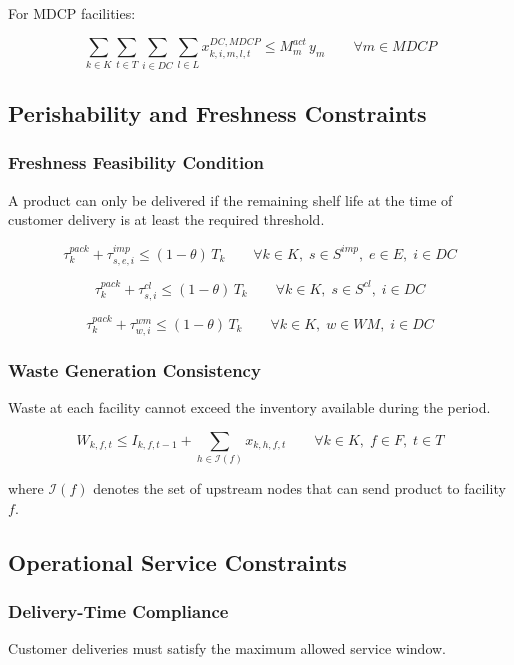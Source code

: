 \documentclass[12pt]{article}
\begin{document}
For MDCP facilities:

\[
\sum_{k \in K}\sum_{t \in T}\sum_{i \in DC}\sum_{l \in L}
x^{DC,MDCP}_{k,i,m,l,t}
\leq
M^{act}_m\, y_m
\qquad
\forall m \in MDCP
\]

\subsection{Perishability and Freshness Constraints}

\subsubsection{Freshness Feasibility Condition}

A product can only be delivered if the remaining shelf life at the time of customer delivery is at least the required threshold.

\[
\tau^{pack}_k + \tau^{imp}_{s,e,i} \leq (1-\theta)\, T_k
\qquad
\forall k \in K,\; s \in S^{imp},\; e \in E,\; i \in DC
\]

\[
\tau^{pack}_k + \tau^{cl}_{s,i} \leq (1-\theta)\, T_k
\qquad
\forall k \in K,\; s \in S^{cl},\; i \in DC
\]

\[
\tau^{pack}_k + \tau^{wm}_{w,i} \leq (1-\theta)\, T_k
\qquad
\forall k \in K,\; w \in WM,\; i \in DC
\]

\subsubsection{Waste Generation Consistency}

Waste at each facility cannot exceed the inventory available during the period.

\[
W_{k,f,t} \leq I_{k,f,t-1} + \sum_{h \in \mathcal{I}(f)} x_{k,h,f,t}
\qquad
\forall k \in K,\; f \in F,\; t \in T
\]

where \(\mathcal{I}(f)\) denotes the set of upstream nodes that can send product to facility \(f\).

\subsection{Operational Service Constraints}

\subsubsection{Delivery-Time Compliance}

Customer deliveries must satisfy the maximum allowed service window.
\end{document}
